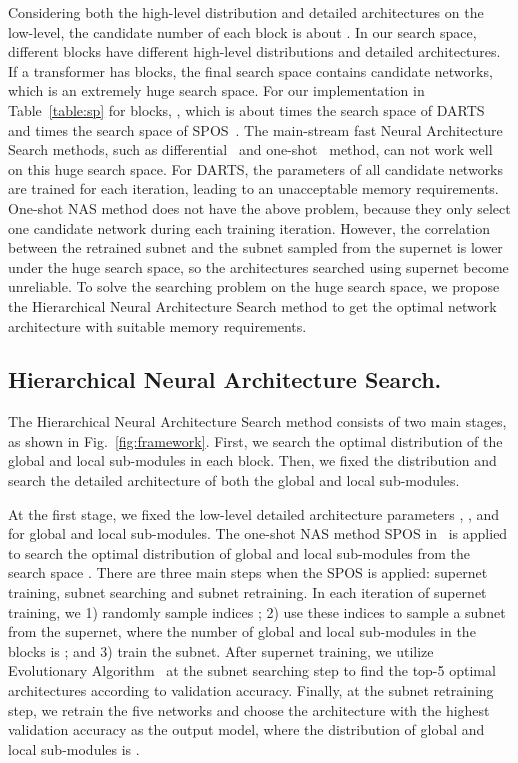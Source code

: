 \documentclass[10pt,twocolumn,letterpaper]{article}
\begin{document}
{}
Considering both the high-level distribution and detailed architectures on the low-level, the candidate number of each block is about . In our search space, different blocks have different high-level distributions and detailed architectures. If a transformer has  blocks, the final search space contains  candidate networks, which is an extremely huge search space. For our implementation in Table~\ref{table:sp} for  blocks, , which is about  times the search space of DARTS~\cite{Darts-ICLR19-Liu} and  times the search space of SPOS~\cite{SPOS-ECCV20-Guo}.
The main-stream fast Neural Architecture Search methods, such as differential~\cite{Darts-ICLR19-Liu} and one-shot~\cite{SPOS-ECCV20-Guo} method, can not work well on this huge search space. For DARTS, the parameters of all candidate networks are trained for each iteration, leading to an unacceptable memory requirements. One-shot NAS method does not have the above problem, because they only select one candidate network during each training iteration. However, the correlation between the retrained subnet and the subnet sampled from the supernet is lower under the huge search space, so the architectures searched using supernet become unreliable. To solve the searching problem on the huge search space, we propose the Hierarchical Neural Architecture Search method to get the optimal network architecture with suitable memory requirements.




\subsection{Hierarchical Neural Architecture Search. }
\label{sub:hnas}
The Hierarchical Neural Architecture Search method consists of two main stages, as shown in Fig.~\ref{fig:framework}. First, we search the optimal distribution  of the global and local sub-modules in each block. Then, we fixed the distribution  and search the detailed architecture  of both the global and local sub-modules.

\vspace{-1mm}
{}
At the first stage, we fixed the low-level detailed architecture parameters , ,  and  for global and local sub-modules.
The one-shot NAS method SPOS in~\cite{SPOS-ECCV20-Guo} is applied to search the optimal distribution of global and local sub-modules from the search space . There are three main steps when the SPOS is applied: supernet training, subnet searching and subnet retraining. 
In each iteration of supernet training, we 1) randomly sample indices ; 2) use these indices to sample a subnet from the supernet, where the number of global and local sub-modules in the  blocks is ; and 3) train the subnet. 
After supernet training, we utilize Evolutionary Algorithm~\cite{SPOS-ECCV20-Guo} at the subnet searching step to find the top-5 optimal architectures according to validation accuracy. Finally, at the  subnet retraining step, we  retrain the five networks and choose the architecture with the highest validation accuracy as the output model, where the distribution of global and local sub-modules is .
\end{document}
